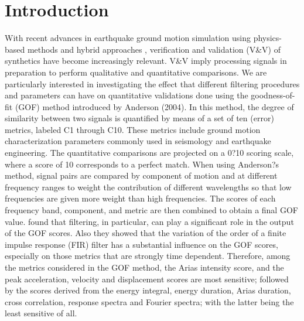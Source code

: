 \documentclass{article}
\begin{document}
\section{Introduction}

\noindent
With recent advances in earthquake ground motion simulation using physics-based methods and hybrid approaches \citep[e.g.,][]{Bielak_2010,Graves_2010}, verification and validation (V\&V) of synthetics have become increasingly relevant. V\&V imply processing signals in preparation to perform qualitative and quantitative comparisons. We are particularly interested in investigating the effect that different filtering procedures and parameters can have on quantitative validations done using the goodness-of-fit (GOF) method introduced by Anderson (2004). In this method, the degree of similarity between two signals is quantified by means of a set of ten (error) metrics, labeled C1 through C10. These metrics include ground motion characterization parameters commonly used in seismology and earthquake engineering. The quantitative comparisons are projected on a 0?10 scoring scale, where a score of 10 corresponds to a perfect match. When using Anderson?s method, signal pairs are compared by component of motion and at different frequency ranges to weight the contribution of different wavelengths so that low frequencies are given more weight than high frequencies.
The scores of each frequency band, component, and metric are then combined to obtain a final GOF value. \citet{Khoshnevis_2015} found that filtering, in particular, can play a significant role in the output of the GOF scores. Also they showed that the variation of the order of a finite impulse response (FIR) filter has a substantial influence on the GOF scores, especially on those metrics that are strongly time dependent. Therefore, among the metrics considered in the GOF method, the Arias intensity score, and the peak acceleration, velocity and displacement scores are most sensitive; followed by the scores derived from the energy integral, energy duration, Arias duration, cross correlation, response spectra and Fourier spectra; with the latter being the least sensitive of all.
\end{document}

